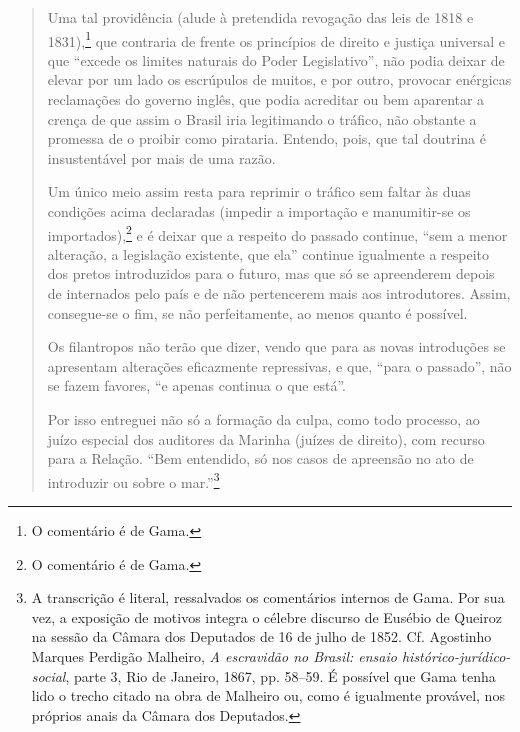 \begin{quote}
Uma tal providência (alude à pretendida revogação das leis de 1818 e
1831),\footnote{O comentário é de Gama.} que contraria de frente os
princípios de direito e justiça universal e que ``excede os limites
naturais do Poder Legislativo'', não podia deixar de elevar por um lado
os escrúpulos de muitos, e por outro, provocar enérgicas reclamações do
governo inglês, que podia acreditar ou bem aparentar a crença de que
assim o Brasil iria legitimando o tráfico, não obstante a promessa de o
proibir como pirataria. Entendo, pois, que tal doutrina é insustentável
por mais de uma razão.

Um único meio assim resta para reprimir o tráfico sem faltar às duas
condições acima declaradas (impedir a importação e manumitir-se os
importados),\footnote{O comentário é de Gama.} e é deixar que a
respeito do passado continue, ``sem a menor alteração, a legislação
existente, que ela'' continue igualmente a respeito dos pretos
introduzidos para o futuro, mas que só se apreenderem depois de
internados pelo país e de não pertencerem mais aos introdutores. Assim,
consegue-se o fim, se não perfeitamente, ao menos quanto é possível.

\noindent\dotfill{}

Os filantropos não terão que dizer, vendo que para as novas introduções
se apresentam alterações eficazmente repressivas, e que, ``para o
passado'', não se fazem favores, ``e apenas continua o que está''.

\noindent\dotfill{}

Por isso entreguei não só a formação da culpa, como todo processo, ao
juízo especial dos auditores da Marinha (juízes de direito), com recurso
para a Relação. ``Bem entendido, só nos casos de apreensão no ato de
introduzir ou sobre o mar.''\footnote{A transcrição é literal,
  ressalvados os comentários internos de Gama. Por sua vez, a exposição
  de motivos integra o célebre discurso de Eusébio de Queiroz na sessão
  da Câmara dos Deputados de 16 de julho de 1852. Cf. Agostinho Marques Perdigão
Malheiro, \emph{A escravidão no Brasil: ensaio histórico-jurídico-social},
parte 3, Rio de Janeiro, 1867, pp. 58--59. É possível que Gama tenha lido o trecho
  citado na obra de Malheiro ou, como é igualmente provável, nos
  próprios anais da Câmara dos Deputados.}
\end{quote}  

